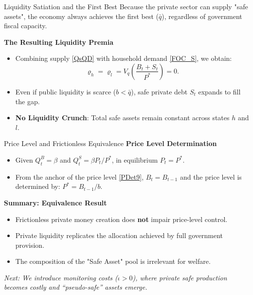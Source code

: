 \documentclass[11pt,aspectratio=169]{beamer}
\begin{document}
\begin{frame}{Liquidity Satiation and the First Best}
\small
Because the private sector can supply "safe assets", the economy always achieves the first best ($\bar{q}$), regardless of government fiscal capacity.

\vspace{0.2cm}
\textbf{The Resulting Liquidity Premia}
\begin{itemize}
    \item Combining supply \eqref{QsQD} with household demand \eqref{FOC_S}, we obtain:
    \begin{equation*}
    \varrho _{h}=\varrho _{l}=V_{q}\left( \frac{B_{t}+S_{t}}{P^{\ast }}\right) =0.
    \end{equation*}
    \item Even if public liquidity is scarce ($b<\bar q$), safe private debt $S_t$ expands to fill the gap.
    \item \textbf{No Liquidity Crunch}: Total safe assets remain constant across states $h$ and $l$.
\end{itemize}
\end{frame}

\begin{frame}{Price Level and Frictionless Equivalence}
\small
\textbf{Price Level Determination}
\begin{itemize}
    \item Given $Q_t^B = \beta$ and $Q_t^S = \beta P_t / P^*$, in equilibrium $P_t = P^*$.
    \item From the anchor of the price level \eqref{PDet9}, $B_t = B_{t-1}$ and the price level is determined by: $P^* = B_{t-1}/b$.
\end{itemize}

\vspace{0.4cm}
\textbf{Summary: Equivalence Result}
\begin{itemize}
    \item Frictionless private money creation does \textbf{not} impair price-level control.
    \item Private liquidity replicates the allocation achieved by full government provision.
    \item The composition of the "Safe Asset" pool is irrelevant for welfare.
\end{itemize}

\vspace{0.3cm}
\vspace{0.25cm}
{\small\textit{Next: We introduce monitoring costs ($\iota>0$), where private safe production becomes costly and ``pseudo-safe'' assets emerge.}}

\end{frame}
\end{document}
